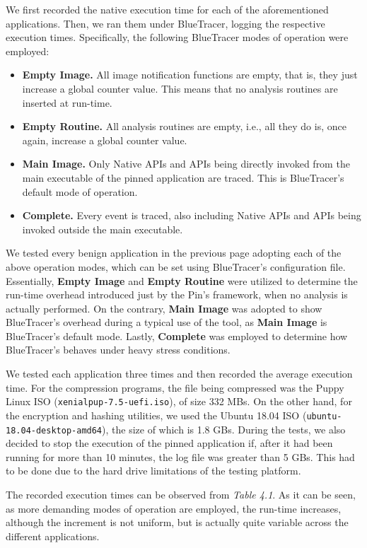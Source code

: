 We first recorded the native execution time for each of the aforementioned applications. Then, we ran them under BlueTracer, logging the respective execution times. Specifically, the following BlueTracer modes of operation were employed:

\begin{itemize}
\item \textbf{Empty Image.} All image notification functions are empty, that is, they just increase a global counter value. This means that no analysis routines are inserted at run-time. 
\item \textbf{Empty Routine.} All analysis routines are empty, i.e., all they do is, once again, increase a global counter value.
\item \textbf{Main Image.} Only Native APIs and APIs being directly invoked from the main executable of the pinned application are traced. This is BlueTracer's default mode of operation. 
\item \textbf{Complete.} Every event is traced, also including Native APIs and APIs being invoked outside the main executable.
\end{itemize}

We tested every benign application in the previous page adopting each of the above operation modes, which can be set using BlueTracer's configuration file. Essentially, \textbf{Empty Image} and \textbf{Empty Routine} were utilized to determine the run-time overhead introduced just by the Pin's framework, when no analysis is actually performed. On the contrary, \textbf{Main Image} was adopted to show BlueTracer's overhead during a typical use of the tool, as \textbf{Main Image} is BlueTracer's default mode. Lastly, \textbf{Complete} was employed to determine how BlueTracer's behaves under heavy stress conditions.

We tested each application three times and then recorded the average execution time. For the compression programs, the file being compressed was the Puppy Linux ISO (\texttt{xenialpup-7.5-uefi.iso}), of size 332 MBs. On the other hand, for the encryption and hashing utilities, we used the Ubuntu 18.04 ISO (\texttt{ubuntu-18.04-desktop-amd64}), the size of which is 1.8 GBs. During the tests, we also decided to stop the execution of the pinned application if, after it had been running for more than 10 minutes, the log file was greater than 5 GBs. This had to be done due to the hard drive limitations of the testing platform.      

The recorded execution times can be observed from \textit{Table 4.1}. As it can be seen, as more demanding modes of operation are employed, the run-time increases, although the increment is not uniform, but is actually quite variable across the different applications.

